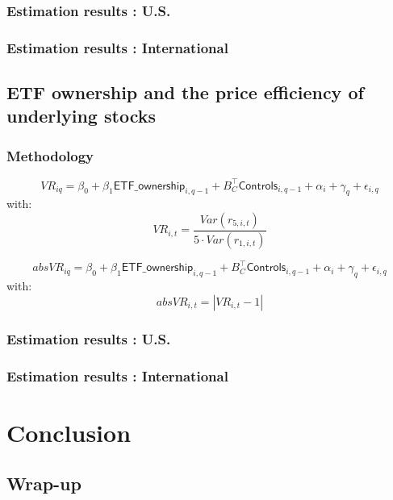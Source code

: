 \documentclass[handout, 9pt, usenames, dvipsnames]{beamer}
\begin{document}
\begin{frame}
  \frametitle{Estimation results : U.S.}
  \centering
  
\end{frame}

\begin{frame}
  \frametitle{Estimation results : International}
  \centering
  
\end{frame}


\subsection{ETF ownership and the price efficiency of underlying stocks}
\begin{frame}
  \frametitle{Methodology}
  
\begin{equation}
  VR_{iq} = \beta_{0} + \beta_{1} \mathsf{ETF\_ownership}_{i, q - 1} + B_{C}^{\intercal} \mathsf{Controls}_{i, q - 1} + \alpha_{i} + \gamma_{q} + \epsilon_{i, q}
\end{equation}
with:
\begin{equation*}
 VR_{i,t} = \frac{\mathit{Var}(r_{5,i,t})}{5 \cdot \mathit{Var}(r_{1, i,t})}
\end{equation*}


\begin{equation}
 absVR_{iq} = \beta_{0} + \beta_{1} \mathsf{ETF\_ownership}_{i, q - 1} + B_{C}^{\intercal} \mathsf{Controls}_{i, q - 1} + \alpha_{i} + \gamma_{q} + \epsilon_{i, q}
\end{equation}
with:
\begin{equation*}
absVR_{i,t} = \left\lvert VR_{i, t}  - 1\right\rvert  
\end{equation*}
\end{frame}

\begin{frame}
  \frametitle{Estimation results : U.S.}
  \centering
  
\end{frame}

\begin{frame}
  \frametitle{Estimation results : International}
  \centering
  
\end{frame}

\section{Conclusion}
\subsection{Wrap-up}
\end{document}

